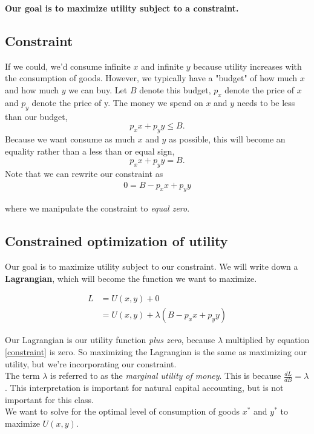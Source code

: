 \documentclass{article}
\begin{document}
\textbf{Our goal is to maximize utility subject to a constraint. }

\subsection{Constraint}
If we could, we'd consume infinite $x$ and infinite $y$ because utility increases with the consumption of goods. However, we typically have a "budget" of how much $x$ and how much $y$ we can buy. Let $B$ denote this budget, $p_x$ denote the price of $x$ and $p_y$ denote the price of y. The money we spend on $x$ and $y$ needs to be less than our budget,
$$p_x x + p_y y \leq B.$$
Because we want consume as much $x$ and $y$ as possible, this will become an equality rather than a less than or equal sign, 
$$p_x x + p_y y = B.$$
Note that we can rewrite our constraint as 
\begin{align}
    0 = B - p_x x + p_y y
    \label{constraint}
\end{align}

where we manipulate the constraint to \textit{equal zero}. 

\subsection{Constrained optimization of utility}
Our goal is to maximize utility subject to our constraint. We will write down a \textbf{Lagrangian}, which will become the function we want to maximize. 

\begin{align}
    L &= U(x, y) + 0 \\
    &= U(x, y) + \lambda (B - p_x x + p_y y) \label{lagrange}
\end{align}

Our Lagrangian is our utility function \textit{plus zero}, because $\lambda$ multiplied by equation \ref{constraint} is zero. So maximizing the Lagrangian is the same as maximizing our utility, but we're incorporating our constraint. \\

The term $\lambda$ is referred to as the \textit{marginal utility of money}. This is because $\frac{d L}{d B} = \lambda$. This interpretation is important for natural capital accounting, but is not important for this class. \\

We want to solve for the optimal level of consumption of goods $x^*$ and $y^*$ to maximize $U(x,y)$. \\
\end{document}
